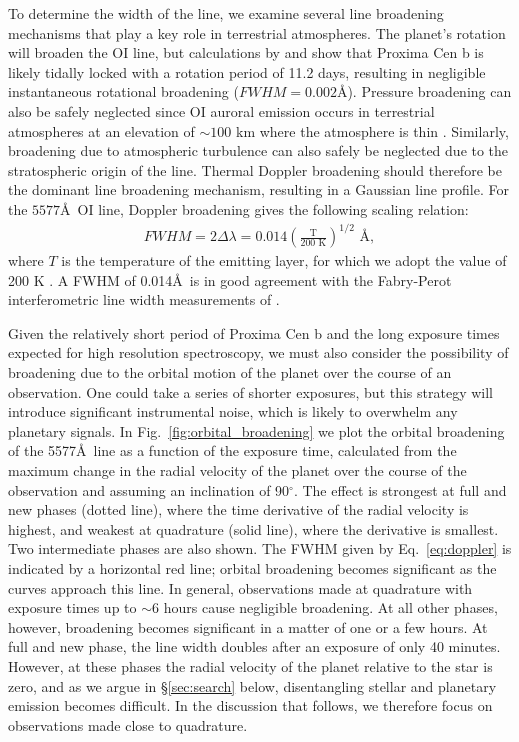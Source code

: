 \documentclass{emulateapj}
\newcommand{\XXX}[1]{#1}      %
\begin{document}
To determine the width of the line, we examine several line broadening mechanisms that play a key role in terrestrial atmospheres.   The planet's rotation will broaden the OI line, but calculations by \citet{Barnes2016} and \citet{Ribas2016} show that Proxima Cen b is likely tidally locked with a rotation period of 11.2 days, resulting in negligible instantaneous rotational broadening ($FWHM = 0.002$\AA).  Pressure broadening can also be safely neglected since OI auroral emission occurs in terrestrial atmospheres at an elevation of ${\sim}100$ km where the atmosphere is thin \citep{Slanger2001}.  \XXX{Similarly, broadening due to atmospheric turbulence can also safely be neglected due to the stratospheric origin of the line.} \XXX{Thermal Doppler} broadening should therefore be the dominant line broadening mechanism, resulting in a Gaussian line profile. For the $5577$\AA\ OI line, Doppler broadening gives the following scaling relation:
\begin{align}
    FWHM = 2\Delta \lambda = 0.014 \left ( \frac{\text{T}}{200 \text{ K}} \right )^{1/2} \text{ \AA}, \label{eq:doppler}
\end{align}
\noindent where $T$ is the temperature of the emitting layer, for which we adopt the value of 200 K \citep[c.f.][]{Slanger2001}. 
A FWHM of 0.014\AA\ is in good agreement with the Fabry-Perot interferometric line width measurements of \citet{Wark1960}.

Given the relatively short period of Proxima Cen b \XXX{and the long exposure times expected for high resolution spectroscopy}, we must also consider the possibility of broadening due to the orbital motion of the planet over the course of an observation. \XXX{One could take a series of shorter exposures, but this strategy will introduce significant instrumental noise, which is likely to overwhelm any planetary signals.} In Fig.~\ref{fig:orbital_broadening} we plot the orbital broadening of the 5577\AA\ line as a function of the exposure time, calculated from the maximum change in the radial velocity of the planet over the course of the observation and assuming an inclination of 90$^\circ$. The effect is strongest at full and new phases (dotted line), where the time derivative of the radial velocity is highest, and weakest at quadrature (solid line), where the derivative is smallest. Two intermediate phases are also shown. The FWHM given by Eq.~\ref{eq:doppler} is indicated by a horizontal red line; orbital broadening becomes significant as the curves approach this line. In general, observations made at quadrature with exposure times up to ${\sim} 6$ hours cause negligible broadening. At all other phases, however, broadening becomes significant in a matter of one or a few hours. At full and new phase, the line width doubles after an exposure of only 40 minutes. However, at these phases the radial velocity of the planet relative to the star is zero, and as we argue in \S\ref{sec:search} below, disentangling stellar and planetary emission becomes difficult. In the discussion that follows, we therefore focus on observations made close to quadrature.
\end{document}
